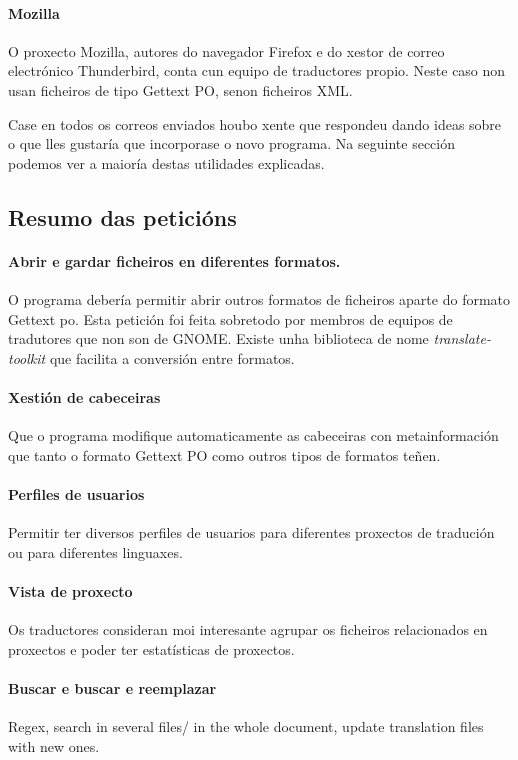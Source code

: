 \paragraph{Mozilla} O proxecto Mozilla, autores do navegador Firefox e do xestor de correo electrónico Thunderbird, conta cun equipo de traductores propio. Neste caso non usan ficheiros de tipo Gettext PO, senon ficheiros XML.

Case en todos os correos enviados houbo xente que respondeu dando ideas sobre o que lles gustaría que incorporase o novo programa. Na seguinte sección podemos ver a maioría destas utilidades explicadas.

\subsection{Resumo das peticións}
	\paragraph{Abrir e gardar ficheiros en diferentes formatos.} O programa debería permitir abrir outros formatos de ficheiros aparte do formato Gettext po. Esta petición foi feita sobretodo por membros de equipos de tradutores que non son de GNOME. Existe unha biblioteca de nome \emph{translate-toolkit} que facilita a conversión entre formatos.

	\paragraph{Xestión de cabeceiras} Que o programa modifique automaticamente as cabeceiras con metainformación que tanto o formato Gettext PO como outros tipos de formatos teñen.

	\paragraph{Perfiles de usuarios} Permitir ter diversos perfiles de usuarios para diferentes proxectos de tradución ou para diferentes linguaxes.

	\paragraph{Vista de proxecto} Os traductores consideran moi interesante agrupar os ficheiros relacionados en proxectos e poder ter estatísticas de proxectos.

	\paragraph{Buscar e buscar e reemplazar}  Regex, search in several files/ in the whole document, update translation files with new ones.

